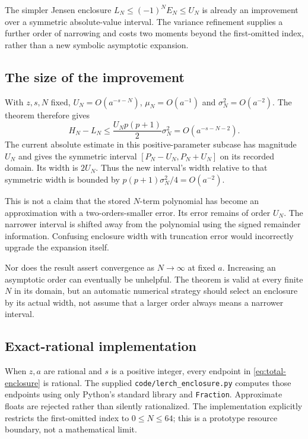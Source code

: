 \documentclass[11pt,a4paper]{article}
\newcommand{\code}[1]{\nolinkurl{#1}}
\begin{document}
The simpler Jensen enclosure $L_N\leq(-1)^NE_N\leq U_N$ is already an improvement over a symmetric absolute-value interval. The variance refinement supplies a further order of narrowing and costs two moments beyond the first-omitted index, rather than a new symbolic asymptotic expansion.

\subsection{The size of the improvement}
With $z,s,N$ fixed, $U_N=O(a^{-s-N})$, $\mu_N=O(a^{-1})$ and $\sigma_N^2=O(a^{-2})$. The theorem therefore gives
\begin{equation}\label{eq:width-order}
 H_N-L_N\leq \frac{U_Np(p+1)}2\sigma_N^2
               =O(a^{-s-N-2}).
\end{equation}
The current absolute estimate in this positive-parameter subcase has magnitude $U_N$ and gives the symmetric interval $[P_N-U_N,P_N+U_N]$ on its recorded domain. Its width is $2U_N$. Thus the new interval's width relative to that symmetric width is bounded by $p(p+1)\sigma_N^2/4=O(a^{-2})$.

This is not a claim that the stored $N$-term polynomial has become an approximation with a two-orders-smaller error. Its error remains of order $U_N$. The narrower interval is shifted away from the polynomial using the signed remainder information. Confusing enclosure width with truncation error would incorrectly upgrade the expansion itself.

Nor does the result assert convergence as $N\to\infty$ at fixed $a$. Increasing an asymptotic order can eventually be unhelpful. The theorem is valid at every finite $N$ in its domain, but an automatic numerical strategy should select an enclosure by its actual width, not assume that a larger order always means a narrower interval.

\subsection{Exact-rational implementation}
When $z,a$ are rational and $s$ is a positive integer, every endpoint in \eqref{eq:total-enclosure} is rational. The supplied \code{code/lerch_enclosure.py} computes those endpoints using only Python's standard library and \code{Fraction}. Approximate floats are rejected rather than silently rationalized. The implementation explicitly restricts the first-omitted index to $0\leq N\leq64$; this is a prototype resource boundary, not a mathematical limit.
\end{document}
